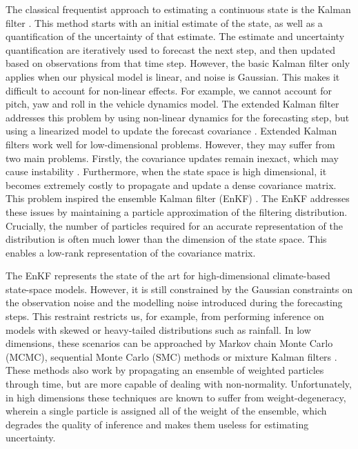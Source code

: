 \documentclass[12pt]{article}
\begin{document}
The classical frequentist approach
to estimating a continuous state is the Kalman filter \cite{kalman1960,simon2006}. This
method starts with an initial estimate of the state, as well as a
quantification of the uncertainty of that estimate. The estimate and uncertainty
quantification are iteratively used to forecast the next step, and then
updated based on observations from that time step. However, the basic
Kalman filter only applies when our physical model is linear, and noise
is Gaussian. This makes it difficult to account for non-linear effects. For example,
we cannot account for pitch, yaw and roll in the vehicle dynamics model.
The extended Kalman filter addresses this problem by using non-linear dynamics
for the forecasting step, but using a linearized model to update the forecast
covariance \cite{jazwinski1970,evensen2009}. Extended Kalman filters work well for low-dimensional problems.
However, they may suffer from two main problems. Firstly, the covariance
updates remain inexact, which may cause instability \cite{evensen1992}.
Furthermore, when the state space is high dimensional, it becomes extremely
costly to propagate and update a dense covariance matrix. This problem
inspired the ensemble Kalman filter (EnKF) \cite{evensen1994,evensen2003}.
The EnKF addresses these issues by maintaining a particle
approximation of the filtering distribution. Crucially, the number of particles
required for an accurate representation of the distribution is often much lower
than the dimension of the state space. This enables a low-rank representation
of the covariance matrix.

The EnKF represents the state of the art for high-dimensional
climate-based state-space models. However, it is still constrained by the
Gaussian constraints on the observation noise and the modelling noise introduced
during the forecasting steps. This restraint restricts us, for example, from
performing inference on models with skewed or heavy-tailed distributions such as
rainfall. In low dimensions, these scenarios can be approached by Markov chain
Monte Carlo (MCMC), sequential Monte Carlo (SMC) methods
\cite{doucet2001,doucet2000,chopin2020} or mixture Kalman filters
\cite{chen2000}. These methods also work by propagating an ensemble of
weighted particles through time, but are more capable of dealing with
non-normality. Unfortunately, in high dimensions these techniques are known to
suffer from weight-degeneracy, wherein a single particle is assigned all of the
weight of the ensemble, which degrades the quality of inference and makes them
useless for estimating uncertainty.
\end{document}
